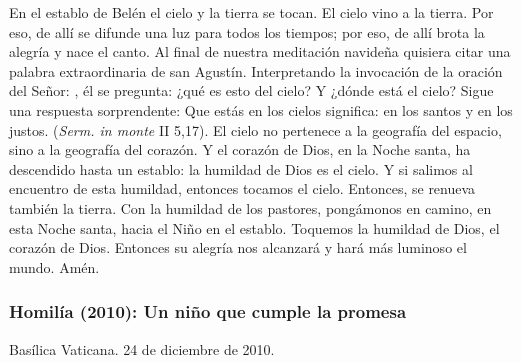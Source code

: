 En el establo de Belén el cielo y la tierra se tocan. El cielo vino a la tierra. Por eso, de allí se difunde una luz para todos los tiempos; por eso, de allí brota la alegría y nace el canto. Al final de nuestra meditación navideña quisiera citar una palabra extraordinaria de san Agustín. Interpretando la invocación de la oración del Señor: , él se pregunta: ¿qué es esto del cielo? Y ¿dónde está el cielo? Sigue una respuesta sorprendente: Que estás en los cielos significa: en los santos y en los justos.  (\emph{Serm. in monte} II 5,17). El cielo no pertenece a la geografía del espacio, sino a la geografía del corazón. Y el corazón de Dios, en la Noche santa, ha descendido hasta un establo: la humildad de Dios es el cielo. Y si salimos al encuentro de esta humildad, entonces tocamos el cielo. Entonces, se renueva también la tierra. Con la humildad de los pastores, pongámonos en camino, en esta Noche santa, hacia el Niño en el establo. Toquemos la humildad de Dios, el corazón de Dios. Entonces su alegría nos alcanzará y hará más luminoso el mundo. Amén.

\subsubsection{Homilía (2010): Un niño que cumple la promesa}

Basílica Vaticana. 24 de diciembre de 2010.

